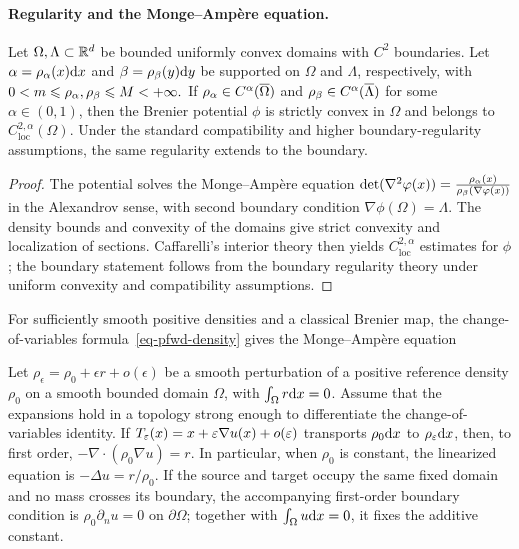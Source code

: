\paragraph{Regularity and the Monge--Amp\`ere equation.}
\begin{prop}\label{prop-caffarelli-regularity}
Let $\Omega,\Lambda\subset\mathbb{R}^d$ be bounded uniformly convex domains with $C^2$ boundaries. Let $\alpha=\rho_{\alpha}(x)\mathrm{d} x$ and $\beta=\rho_{\beta}(y)\mathrm{d} y$ be supported on $\Omega$ and $\Lambda$, respectively, with
\(0<m\leqslant\rho_{\alpha},\rho_{\beta}\leqslant M<+\infty.\)
If $\rho_{\alpha}\in C^\alpha(\overline\Omega)$ and $\rho_{\beta}\in C^\alpha(\overline\Lambda)$ for some $\alpha\in(0,1)$, then the Brenier potential $\phi$ is strictly convex in $\Omega$ and belongs to $C^{2,\alpha}_{\mathrm{loc}}(\Omega)$. Under the standard compatibility and higher boundary-regularity assumptions, the same regularity extends to the boundary.
\end{prop}
\begin{proof}
The potential solves the Monge--Amp\`ere equation
\(\det(\nabla^2\varphi(x)) =\frac{\rho_{\alpha}(x)}{\rho_{\beta}(\nabla\varphi(x))}\)
in the Alexandrov sense, with second boundary condition $\nabla\phi(\Omega)=\Lambda$. The density bounds and convexity of the domains give strict convexity and localization of sections. Caffarelli's interior theory then yields $C^{2,\alpha}_{\mathrm{loc}}$ estimates for $\phi$; the boundary statement follows from the boundary regularity theory under uniform convexity and compatibility assumptions.
\end{proof}
For sufficiently smooth positive densities and a classical Brenier map, the change-of-variables formula~\eqref{eq-pfwd-density} gives the Monge--Amp\`ere equation
\begin{prop}\label{prop-linearized-monge-ampere}
Let $\rho_\epsilon=\rho_0+\epsilon r+o(\epsilon)$ be a smooth perturbation of a positive reference density $\rho_0$ on a smooth bounded domain $\Omega$, with $\int_\Omega r\mathrm{d} x=0$. Assume that the expansions hold in a topology strong enough to differentiate the change-of-variables identity. If $T_\varepsilon(x)=x+\varepsilon\nabla u(x)+o(\varepsilon)$ transports $\rho_0\mathrm{d} x$ to $\rho_\varepsilon\mathrm{d} x$, then, to first order,
\(-\nabla\cdot(\rho_0\nabla u)=r.\)
In particular, when $\rho_0$ is constant, the linearized equation is $-\Delta u=r/\rho_0$. If the source and target occupy the same fixed domain and no mass crosses its boundary, the accompanying first-order boundary condition is $\rho_0\partial_n u=0$ on $\partial\Omega$; together with $\int_\Omega u\mathrm{d} x=0$, it fixes the additive constant.
\end{prop}

